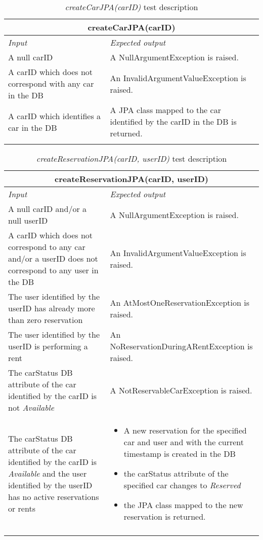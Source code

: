 \begin{longtable}{p{0.4\linewidth}p{0.6\linewidth}}
\multicolumn{2}{c}{\textbf{createCarJPA(carID)}} \\
\toprule
\emph{Input} & \emph{Expected output} \\
\midrule
A null carID & A NullArgumentException is raised.\\
\midrule
A carID which does not correspond with any car in the DB & An InvalidArgumentValueException is raised. \\
\midrule
A carID which identifies a car in the DB & A JPA class mapped to the car identified by the carID in the DB is returned. \\
\bottomrule
\caption{\emph{createCarJPA(carID)} test description}
\end{longtable}


\begin{longtable}{p{0.4\linewidth}p{0.6\linewidth}}
\multicolumn{2}{c}{\textbf{createReservationJPA(carID, userID)}} \\
\toprule
\emph{Input} & \emph{Expected output} \\
\midrule
A null carID and/or a null userID & A NullArgumentException is raised.\\
\midrule
A carID which does not correspond to any car and/or a userID does not correspond to any user in the DB & An InvalidArgumentValueException is raised. \\
\midrule
The user identified by the userID has already more than zero reservation & An AtMostOneReservationException is raised. \\
\midrule
The user identified by the userID is performing a rent & An NoReservationDuringARentException is raised. \\
\midrule
The carStatus DB attribute of the car identified by the carID is not \emph{Available} & A NotReservableCarException is raised. \\
\midrule
The carStatus DB attribute of the car identified by the carID is \emph{Available} and the user identified by the userID has no active reservations or rents & \begin{itemize}
	\item A new reservation for the specified car and user and with the current timestamp is created in the DB
	\item the carStatus attribute of the specified car changes to \emph{Reserved}
	\item the JPA class mapped to the new reservation is returned.
\end{itemize} \\
\bottomrule
\caption{\emph{createReservationJPA(carID, userID)} test description}
\end{longtable}

